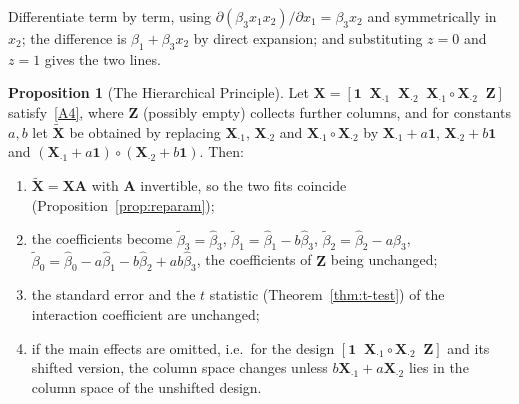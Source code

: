 \documentclass[12pt,a4paper]{article}
\makeatletter
\theoremstyle{definition}
\newtheorem{proposition}[theorem]{Proposition}
\renewenvironment{proof}[1][\proofname]{\par
  \pushQED{\qed}%
  \normalfont \topsep6\p@\@plus6\p@\relax
  \trivlist
  \item[\hskip\labelsep\bfseries #1\@addpunct{.}]\ignorespaces
}{%
  \popQED\endtrivlist\@endpefalse
}
\newcommand{\bX}{\mathbf{X}}
\newcommand{\bone}{\mathbf{1}}
\newcommand{\bA}{\mathbf{A}}
\makeatother
\begin{document}
\begin{proof}
Differentiate term by term, using $\partial(\beta_3x_1x_2)/\partial x_1 = \beta_3x_2$ and symmetrically in $x_2$; the difference is $\beta_1 + \beta_3x_2$ by direct expansion; and substituting $z = 0$ and $z = 1$ gives the two lines.
\end{proof}

\begin{proposition}[The Hierarchical Principle]\label{prop:hierarchy}
Let $\bX = [\bone \;\; \bX_{\cdot 1} \;\; \bX_{\cdot 2} \;\; \bX_{\cdot 1} \circ \bX_{\cdot 2} \;\; \mathbf{Z}]$ satisfy~\ref{A4}, where $\mathbf{Z}$ (possibly empty) collects further columns, and for constants $a, b$ let $\tilde{\bX}$ be obtained by replacing $\bX_{\cdot 1}$, $\bX_{\cdot 2}$ and $\bX_{\cdot 1} \circ \bX_{\cdot 2}$ by $\bX_{\cdot 1} + a\bone$, $\bX_{\cdot 2} + b\bone$ and $(\bX_{\cdot 1} + a\bone) \circ (\bX_{\cdot 2} + b\bone)$. Then:
\begin{enumerate}[label=\textup{(\roman*)}]
\item $\tilde{\bX} = \bX\bA$ with $\bA$ invertible, so the two fits coincide (Proposition~\ref{prop:reparam});
\item the coefficients become $\tilde\beta_3 = \hat\beta_3$, $\tilde\beta_1 = \hat\beta_1 - b\hat\beta_3$, $\tilde\beta_2 = \hat\beta_2 - a\hat\beta_3$, $\tilde\beta_0 = \hat\beta_0 - a\hat\beta_1 - b\hat\beta_2 + ab\hat\beta_3$, the coefficients of $\mathbf{Z}$ being unchanged;
\item the standard error and the $t$ statistic (Theorem~\ref{thm:t-test}) of the interaction coefficient are unchanged;
\item\label{hier:iv} if the main effects are omitted, i.e.\ for the design $[\bone \;\; \bX_{\cdot 1} \circ \bX_{\cdot 2} \;\; \mathbf{Z}]$ and its shifted version, the column space changes unless $b\bX_{\cdot 1} + a\bX_{\cdot 2}$ lies in the column space of the unshifted design.
\end{enumerate}
\end{proposition}
\end{document}
